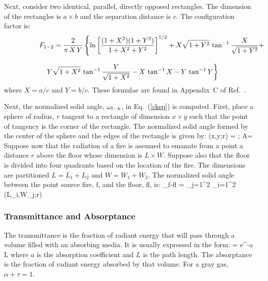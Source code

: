 Next, consider two identical, parallel, directly opposed rectangles. The dimension of the rectangles is $a \times b$ and the separation distance is $c$. The configuration factor is:
\begin{eqnarray}
\lefteqn{F_{1-2} = \frac{2}{\pi \, X \, Y} \left\{ \ln \left[ \frac{(1+X^2)(1+Y^2)}{1+X^2+Y^2} \right]^{1/2} + X \sqrt{1+Y^2} \, \tan^{-1} \frac{X}{\sqrt{1+Y^2}} + \right.} \nonumber \\[.1in]
& & \left. Y \sqrt{1+X^2} \, \tan^{-1} \frac{Y}{\sqrt{1+X^2}} - X \, \tan^{-1} X - Y\, \tan^{-1} Y \right\}
\end{eqnarray}
where $X=a/c$ and $Y=b/c$. These formulae are found in Appendix~C of Ref.~\cite{SiegelandHowell:1981}.

Next, the normalized solid angle, $\omega_{\rm f-k}$, in Eq.~(\ref{ckeq}) is computed. First, place a sphere of radius, $r$ tangent to a rectangle of dimension $x \times y$ such that the point of tangency is the corner of the rectangle. The normalized solid angle formed by the center of the sphere and the edges of the rectangle is given by:
\be
   \omega(x,y;r) =   \quad ; \quad A=
\ee
Suppose now that the radiation of a fire is assumed to emanate from a point a distance $r$ above the floor whose dimension is $L \times W$. Suppose also that the floor is divided into four quadrants based on the location of the fire. The dimensions are partitioned $L=L_1+L_2$ and $W=W_1+W_2$. The normalized solid angle between the point source fire, f, and the floor, fl, is:
\be
   \omega_{\rm f-fl} = \sum_{j=1}^2 \sum_{i=1}^2 \omega(L_i,W_j;r)
\ee

\subsubsection{Transmittance and Absorptance}

The transmittance is the fraction of radiant energy that will pass through a volume filled with an absorbing media. It is usually expressed in the form:
\be
   \tau = {\rm e}^{-a L}
\ee
where $a$ is the absorption coefficient and $L$ is the path length. The absorptance is the fraction of radiant energy absorbed by that volume. For a gray gas, $\alpha + \tau = 1$.

